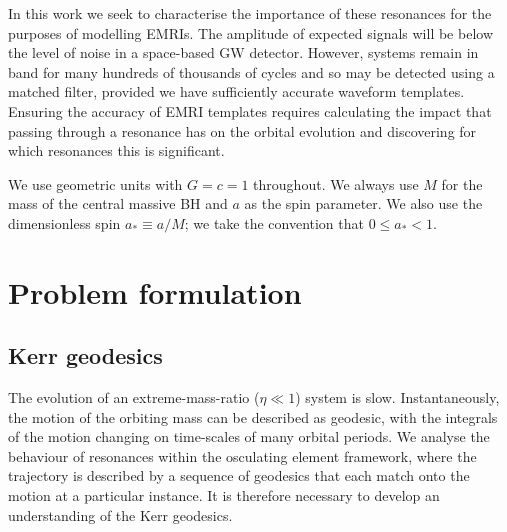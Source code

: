\documentclass[aps,prd,amsfonts,amssymb,amsmath,nofootinbib,reprint,showpacs]{revtex4}
\begin{document}
In this work we seek to characterise the importance of these resonances for the purposes of modelling EMRIs. The amplitude of expected signals will be below the level of noise in a space-based GW detector. However, systems remain in band for many hundreds of thousands of cycles and so may be detected using a matched filter, provided we have sufficiently accurate waveform templates. Ensuring the accuracy of EMRI templates requires calculating the impact that passing through a resonance has on the orbital evolution and discovering for which resonances this is significant.

We use geometric units with $G = c = 1$ throughout. We always use $M$ for the mass of the central massive BH and $a$ as the spin parameter. We also use the dimensionless spin $a_\ast \equiv a/M$; we take the convention that $0 \leq a_\ast < 1$.

\section{Problem formulation}

\subsection{Kerr geodesics}

The evolution of an extreme-mass-ratio ($\eta \ll 1$) system is slow. Instantaneously, the motion of the orbiting mass can be described as geodesic, with the integrals of the motion changing on time-scales of many orbital periods. We analyse the behaviour of resonances within the osculating element framework, where the trajectory is described by a sequence of geodesics that each match onto the motion at a particular instance. It is therefore necessary to develop an understanding of the Kerr geodesics.
\end{document}
